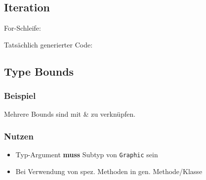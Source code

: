 \begin{minipage}[b]{0.32\columnwidth}
    \subsection{Iteration}
    For-Schleife:
    
\end{minipage}\hfill%
\begin{minipage}[b]{0.68\columnwidth}
    Tatsächlich generierter Code:
    
\end{minipage}

\begin{minipage}[t]{0.54\columnwidth}
    \subsection{Type Bounds}
    \subsubsection{Beispiel}
    
    Mehrere Bounds sind mit \& zu verknüpfen.
\end{minipage}\hfill%
\begin{minipage}[t]{0.45\columnwidth}
    \subsubsection{Nutzen}
    \raggedright%
    \begin{itemize}
        \item Typ-Argument \textbf{muss} Subtyp von \lstinline{Graphic} sein
        \item Bei Verwendung von spez. Methoden in gen. Methode/Klasse
    \end{itemize}
\end{minipage}



